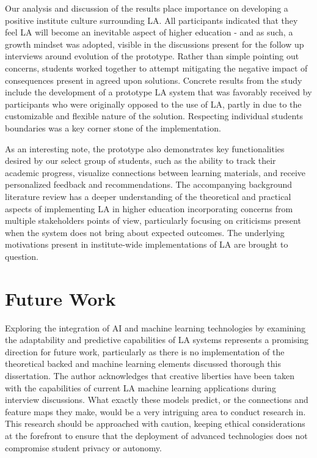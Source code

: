 \documentclass{l4proj}
\begin{document}
Our analysis and discussion of the results place importance on developing a positive institute culture surrounding LA. All participants indicated that they feel LA will become an inevitable aspect of higher education - and as such, a growth mindset was adopted, visible in the discussions present for the follow up interviews around evolution of the prototype. Rather than simple pointing out concerns, students worked together to attempt mitigating the negative impact of consequences present in agreed upon solutions. Concrete results from the study include the development of a prototype LA system that was favorably received by participants who were originally opposed to the use of LA, partly in due to the customizable and flexible nature of the solution. Respecting individual students boundaries was a key corner stone of the implementation. 

As an interesting note, the prototype also demonstrates key functionalities desired by our select group of students, such as the ability to track their academic progress, visualize connections between learning materials, and receive personalized feedback and recommendations. The accompanying background literature review has a deeper understanding of the theoretical and practical aspects of implementing LA in higher education incorporating concerns from multiple stakeholders points of view, particularly focusing on criticisms present when the system does not bring about expected outcomes. The underlying motivations present in institute-wide implementations of LA are brought to question.

\section{Future Work}


Exploring the integration of AI and machine learning technologies by examining the adaptability and predictive capabilities of LA systems represents a promising direction for future work, particularly as there is no implementation of the theoretical backed and machine learning elements discussed thorough this dissertation. The author acknowledges that creative liberties have been taken with the capabilities of current LA machine learning applications during interview discussions. What exactly these models predict, or the connections and feature maps they make, would be a very intriguing area to conduct research in. This research should be approached with caution, keeping ethical considerations at the forefront to ensure that the deployment of advanced technologies does not compromise student privacy or autonomy.
\end{document}
